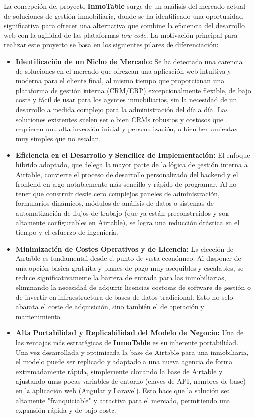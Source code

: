 La concepción del proyecto \textbf{InmoTable} surge de un análisis del mercado actual de soluciones de gestión inmobiliaria, donde se ha identificado una oportunidad significativa para ofrecer una alternativa que combine la eficiencia del desarrollo web con la agilidad de las plataformas \textit{low-code}. La motivación principal para realizar este proyecto se basa en los siguientes pilares de diferenciación:

\begin{itemize}
    \item \textbf{Identificación de un Nicho de Mercado:} Se ha detectado una carencia de soluciones en el mercado que ofrezcan una aplicación web intuitiva y moderna para el cliente final, al mismo tiempo que proporcionan una plataforma de gestión interna (CRM/ERP) excepcionalmente flexible, de bajo coste y fácil de usar para los agentes inmobiliarios, sin la necesidad de un desarrollo a medida complejo para la administración del día a día. Las soluciones existentes suelen ser o bien CRMs robustos y costosos que requieren una alta inversión inicial y personalización, o bien herramientas muy simples que no escalan.
    \item \textbf{Eficiencia en el Desarrollo y Sencillez de Implementación:} El enfoque híbrido adoptado, que delega la mayor parte de la lógica de gestión interna a Airtable, convierte el proceso de desarrollo personalizado del backend y el frontend en algo notablemente más sencillo y rápido de programar. Al no tener que construir desde cero complejos paneles de administración, formularios dinámicos, módulos de análisis de datos o sistemas de automatización de flujos de trabajo (que ya están preconstruidos y son altamente configurables en Airtable), se logra una reducción drástica en el tiempo y el esfuerzo de ingeniería.
    \item \textbf{Minimización de Costes Operativos y de Licencia:} La elección de Airtable es fundamental desde el punto de vista económico. Al disponer de una opción básica gratuita y planes de pago muy asequibles y escalables, se reduce significativamente la barrera de entrada para las inmobiliarias, eliminando la necesidad de adquirir licencias costosas de software de gestión o de invertir en infraestructura de bases de datos tradicional. Esto no solo abarata el coste de adquisición, sino también el de operación y mantenimiento.
    \item \textbf{Alta Portabilidad y Replicabilidad del Modelo de Negocio:} Una de las ventajas más estratégicas de \textbf{InmoTable} es su inherente portabilidad. Una vez desarrollada y optimizada la base de Airtable para una inmobiliaria, el modelo puede ser replicado y adaptado a una nueva agencia de forma extremadamente rápida, simplemente clonando la base de Airtable y ajustando unas pocas variables de entorno (claves de API, nombres de base) en la aplicación web (Angular y Laravel). Esto hace que la solución sea altamente "franquiciable" y atractiva para el mercado, permitiendo una expansión rápida y de bajo coste.
\end{itemize}

